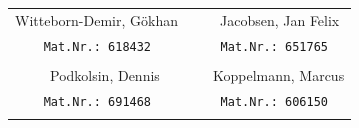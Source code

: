 \begin{tabular}{ll}
	\large{Witteborn-Demir, Gökhan}  &  \large{    Jacobsen, Jan Felix}\\
	\texttt{    Mat.Nr.: 618432}    	 &  \texttt{    Mat.Nr.: 651765}\\
	& \\
	\large{     Podkolsin, Dennis}   	 &  \large{   Koppelmann, Marcus}\\
	\texttt{    Mat.Nr.: 691468}    	 &  \texttt{    Mat.Nr.: 606150}\\
	& \\
\end{tabular}

\pagebreak
	
